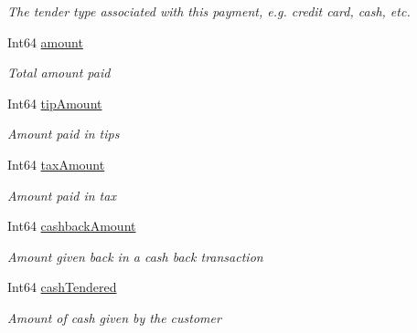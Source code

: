 \begin{DoxyCompactItemize}
\begin{DoxyCompactList}\small\item\em The tender type associated with this payment, e.\+g. credit card, cash, etc. \end{DoxyCompactList}\item 
Int64 \hyperlink{classcom_1_1clover_1_1sdk_1_1v3_1_1payments_1_1_payment_a1fb932f232dd871adb368bd19dcd9ee3}{amount}
\begin{DoxyCompactList}\small\item\em Total amount paid \end{DoxyCompactList}\item 
Int64 \hyperlink{classcom_1_1clover_1_1sdk_1_1v3_1_1payments_1_1_payment_acc7b1bbf6cc2e5132c1c9c08a6af3c23}{tip\+Amount}
\begin{DoxyCompactList}\small\item\em Amount paid in tips \end{DoxyCompactList}\item 
Int64 \hyperlink{classcom_1_1clover_1_1sdk_1_1v3_1_1payments_1_1_payment_acab292836bbf46766b345fd905cde857}{tax\+Amount}
\begin{DoxyCompactList}\small\item\em Amount paid in tax \end{DoxyCompactList}\item 
Int64 \hyperlink{classcom_1_1clover_1_1sdk_1_1v3_1_1payments_1_1_payment_a400f034c598f32cab84cd4a6d05c07db}{cashback\+Amount}
\begin{DoxyCompactList}\small\item\em Amount given back in a cash back transaction \end{DoxyCompactList}\item 
Int64 \hyperlink{classcom_1_1clover_1_1sdk_1_1v3_1_1payments_1_1_payment_ae0e3b81ceba51f3543026985ebb18cd5}{cash\+Tendered}
\begin{DoxyCompactList}\small\item\em Amount of cash given by the customer \end{DoxyCompactList}\item 

\end{DoxyCompactItemize}
